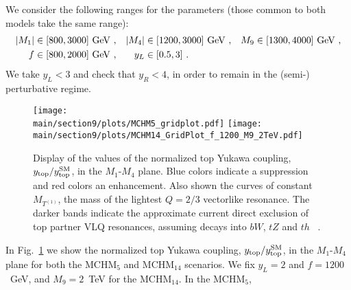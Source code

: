 We consider the following ranges for the parameters (those common to both models take the same range):
\begin{align*}
|M_1|& \in [800, 3000]~{\rm GeV}~, &  |M_4| &\in [1200, 3000]~{\rm GeV}~,  &  M_9 &\in [1300, 4000]~{\rm GeV}~,  \\
f&\in [800, 2000]~{\rm GeV}~,          &  y_L&\in [0.5, 3] ~.
\end{align*}
%
We take $y_L < 3$ and check that $y_R < 4$, in order to remain in the (semi-) perturbative regime.
%
\begin{figure}[t]
\centering
\texttt{[image: \\main/section9/plots/MCHM5\_gridplot.pdf]}
\hspace{3mm}
\texttt{[image: \\main/section9/plots/MCHM14\_GridPlot\_f\_1200\_M9\_2TeV.pdf]}
\caption{Display of the values of the normalized top Yukawa coupling,
$y_{\rm top} / y_{\rm top}^{\rm SM}$, in the $M_1$-$M_4$ plane.  Blue
colors indicate a suppression and red colors an enhancement.  Also
shown the curves of constant $M_{T^{(1)}}$, the mass of the lightest $Q=2/3$
vectorlike resonance.  The darker bands indicate the approximate
current direct exclusion of top partner VLQ resonances, assuming decays into
$bW$, $tZ$ and $th$ ~\cite{Aaboud:2018pii, Sirunyan:2018omb}.}
\label{fig:ytvsM1M4}
\end{figure}
%
In Fig.~\ref{fig:ytvsM1M4} we show the normalized top Yukawa coupling,
$y_{\rm top} / y_{\rm top}^{\rm SM}$, in the $M_1$-$M_4$ plane for
both the MCHM$_5$ and MCHM$_{14}$ scenarios.  We fix $y_L = 2$ and $f
= 1200$~GeV, and $M_9 = 2$~TeV for the MCHM$_{14}$.  In the MCHM$_5$,
